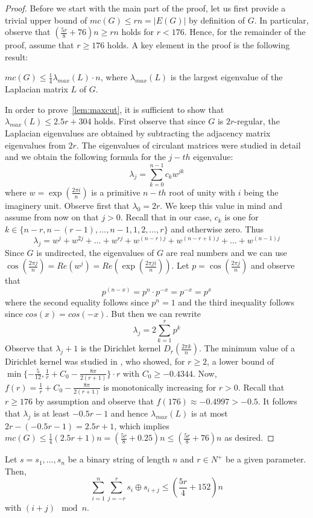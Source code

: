 \documentclass[nolineno,a4paper,USenglish,cleveref,autoref,thm-restate]
{socg}
\begin{document}
\begin{proof}
Before we start with the main part of the proof, let us first provide a trivial upper bound of $mc(G) \leq rn = |E(G)|$ by definition of $G$. In particular, observe that $(\frac{5r}{8}+76)n \geq rn$ holds for $r < 176$. Hence, for the remainder of the proof, assume that $r \geq 176$ holds.
A key element in the proof is the following result:
\begin{lemma}
$mc(G) \leq \frac{1}{4}\lambda_{max}(L)\cdot n$, where $\lambda_{max}(L)$ is the largest eigenvalue of the Laplacian matrix $L$ of $G$.
\end{lemma}
In order to prove~\cref{lem:maxcut}, it is sufficient to show that $\lambda_{max}(L) \leq 2.5r+304$ holds.
First observe that since $G$ is $2r$-regular, the Laplacian eigenvalues are obtained by subtracting the adjacency matrix eigenvalues from $2r$. The eigenvalues of circulant matrices were studied in detail \cite{CIT-006} and we obtain the following formula for the $j-th$ eigenvalue:
\[\lambda_j =\sum_{k=0}^{n-1} c_k w^{jk}\] where $w= \exp(\frac{2\pi i}{n})$ is a primitive $n-th$ root of unity with $i$ being the imaginery unit. 
Observe first that $\lambda_0 = 2r$. We keep this value in mind and assume from now on that $j > 0$. Recall that in our case, $c_k$ is one for $k \in \{n-r,n-(r-1),\dots,n-1,1,2,\dots,r\}$ and otherwise zero. Thus
\[\lambda_j = w^{j}+w^{2j}+\dots+w^{rj}+w^{(n-r)j}+ w^{(n-r+1)j} + \dots + w^{(n-1)j} \]
Since $G$ is undirected, the eigenvalues of $G$ are real numbers and we can use $\cos(\frac{2\pi j}{n}) = Re(w^j) = Re(\exp(\frac{2\pi j i}{n}))$.
Let $p = \cos(\frac{2\pi j}{n})$ and observe that
\[p^{(n-x)} = p^n \cdot p^{-x} = p^{-x} = p^{x} \]
where the second equality follows since $p^{n} = 1$ and the third inequality follows since $cos(x) = cos(-x)$.
But then we can rewrite
\[\lambda_j = 2\sum_{k=1}^r p^k\]
Observe that $\lambda_j+1$ is the Dirichlet kernel $D_r(\frac{2\pi k}{n})$. 
The minimum value of a Dirichlet kernel was studied in \cite{Mercer}, who showed, for $r \geq 2$, a lower bound of $\min\{-\frac{5}{12},\frac{1}{r}+C_0-\frac{8\pi}{2(r+1)}\}\cdot r$ with $C_0 \geq -0.4344$.
Now, $f(r) = \frac{1}{r}+C_0-\frac{8\pi}{2(r+1)}$ is monotonically increasing for $r > 0$. Recall that $r \geq 176$ by assumption and observe that $f(176) \approx -0.4997 > -0.5$. It follows that $\lambda_j$ is at least $-0.5r - 1$ and hence $\lambda_{max}(L)$ is at most $2r-(-0.5r-1) = 2.5r+1$, which implies $mc(G) \leq \frac{1}{4}({2.5r+1})n = (\frac{5r}{8}+0.25)n \leq (\frac{5r}{8}+76)n$ as desired.
\end{proof}
\begin{corollary}\label{cor:balls}
Let $s = s_1,\dots,s_n$ be a binary string of length $n$ and $r\in N^+$ be a given parameter. Then,
\begin{equation}\label{eq:sum}
\sum_{i=1}^n \sum_{j=-r}^r s_i \oplus s_{i+j}  \leq (\frac{5r}{4}+152)n
\end{equation}
with $(i+j) \mod n$.
\end{corollary}
\end{document}
